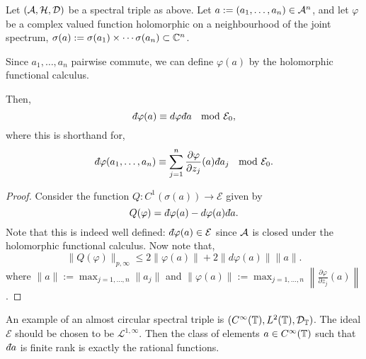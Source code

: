 \begin{proposition}
    Let $(\mathcal{A},\mathcal{H},\mathcal{D})$ be a spectral triple as above. Let $a := (a_1,\ldots,a_n) \in \mathcal{A}^n$,
    and let $\varphi$ be a complex valued function holomorphic
    on a neighbourhood of
    the joint spectrum, $\sigma(a) := \sigma(a_1)\times \cdots \sigma(a_n) \subset \mathbb{C}^n$.
    
    Since $a_1,\ldots,a_n$ pairwise commute, we can define $\varphi(a)$
    by the holomorphic functional calculus.    
    
    Then,
    \begin{equation}
        \qd \varphi(a) \equiv d\varphi \qd a \;\mod{\mathcal{E}_0},
    \end{equation}
    where this is shorthand for,
    \begin{equation}
        \qd \varphi(a_1,\ldots,a_n) \equiv \sum_{j=1}^n \frac{\partial \varphi}{\partial z_j}(a)\qd a_j \;\mod{\mathcal{E}_0}.
    \end{equation}
\end{proposition}
\begin{proof}
    Consider the function $Q:C^1(\sigma(a))\to \mathcal{E}$
    given by
    \begin{equation}
        Q(\varphi) = \qd \varphi(a) - d\varphi(a)\qd a.
    \end{equation}
    Note that this is indeed well defined: $\qd\varphi(a) \in \mathcal{E}$
    since $\mathcal{A}$ is closed under the holomorphic functional calculus.
    Now note that,
    \begin{equation}
        \|Q(\varphi)\|_{p,\infty} \leq 2\|\varphi(a)\| + 2\|d\varphi(a)\|\|a\|.
    \end{equation}
    where $\|a\| := \max_{j = 1,\ldots,n} \|a_j\|$
    and $\|\varphi(a)\| := \max_{j=1,\ldots,n} \left\|\frac{\partial \varphi}{\partial z_j}(a)\right\|$.
    
\end{proof}


\begin{example}
    An example of an almost circular spectral triple is $(C^\infty(\mathbb{T}),L^2(\mathbb{T}),\mathcal{D}_{\mathbb{T}})$.
    The ideal $\mathcal{E}$ should be chosen to be $\mathcal{L}^{1,\infty}$. Then
    the class of elements $a \in C^\infty(\mathbb{T})$ such that $\qd a$ is finite
    rank is exactly the rational functions. 
\end{example}

